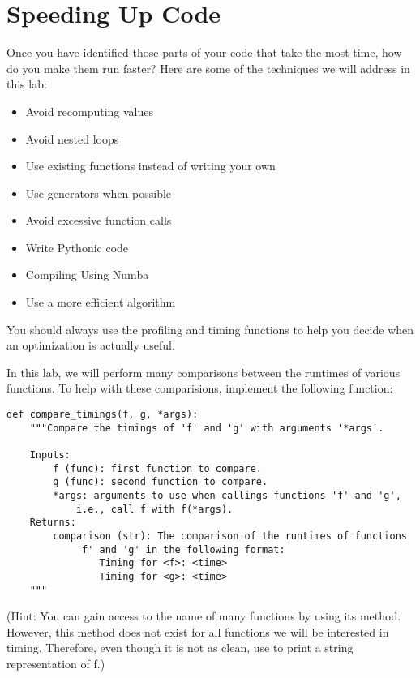 \section*{Speeding Up Code} %

Once you have identified those parts of your code that take the most time, how do you make them run faster?
Here are some of the techniques we will address in this lab:

\begin{itemize}
\item Avoid recomputing values
\item Avoid nested loops
\item Use existing functions instead of writing your own
\item Use generators when possible
\item Avoid excessive function calls
\item Write Pythonic code
\item Compiling Using Numba
\item Use a more efficient algorithm
\end{itemize}

You should always use the profiling and timing functions to help you decide when an optimization is actually useful.

\begin{problem}
In this lab, we will perform many comparisons between the runtimes of various
functions.
To help with these comparisions, implement the following function:

\begin{lstlisting}
def compare_timings(f, g, *args):
    """Compare the timings of 'f' and 'g' with arguments '*args'.

    Inputs:
        f (func): first function to compare.
        g (func): second function to compare.
        *args: arguments to use when callings functions 'f' and 'g',
            i.e., call f with f(*args).
    Returns:
        comparison (str): The comparison of the runtimes of functions
            'f' and 'g' in the following format:
                Timing for <f>: <time>
                Timing for <g>: <time>
    """
\end{lstlisting}
(Hint: You can gain access to the name of many functions by using its  method.
However, this method does not exist for all functions we will be interested in timing.
Therefore, even though it is not as clean, use  to print a string representation of f.)
\end{problem}

